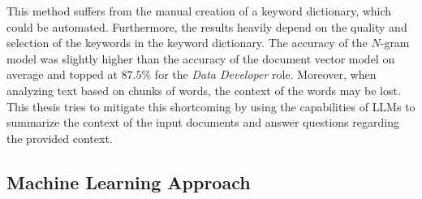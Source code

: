 \documentclass[draft,final]{thesisclass} %
\begin{document}
This method suffers from the manual creation of a keyword dictionary, which could be automated.
Furthermore, the results heavily depend on the quality and selection of the keywords in the keyword dictionary.
The accuracy of the $N$-gram model was slightly higher than the accuracy of the document vector model on average and topped at $87.5\%$ for the \textit{Data Developer} role.
Moreover, when analyzing text based on chunks of words, the context of the words may be lost.
This thesis tries to mitigate this shortcoming by using the capabilities of \gls{LLM}s to summarize the context of the input documents and answer questions regarding the provided context.

\subsection{Machine Learning Approach} \label{machine_learning_approach}
\end{document}
